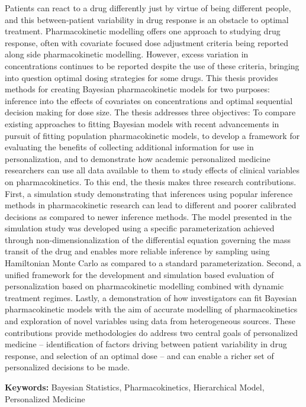 \documentclass[12pt,twoside]{report}
\numberwithin{figure}{chapter}
\newenvironment{preliminary}%
{\pagestyle{plain}\pagenumbering{roman}}%
{\pagenumbering{arabic}}
\begin{document}
\begin{preliminary}
	Patients can react to a drug differently just by virtue of being different people, and this between-patient variability in drug response is an obstacle to optimal treatment.  Pharmacokinetic modelling offers one approach to studying drug response, often with covariate focused dose adjustment criteria being reported along side pharmacokinetic modelling.  However, excess variation in concentrations continues to be reported despite the use of these criteria, bringing into question optimal dosing strategies for some drugs.  This thesis provides methods for creating Bayesian pharmacokinetic models for two purposes: inference into the effects of covariates on concentrations and optimal sequential decision making for dose size.   The thesis addresses three objectives: To compare existing approaches to fitting Bayesian models with recent advancements in pursuit of fitting population pharmacokinetic models, to develop a framework for evaluating the benefits of collecting additional information for use in personalization, and to demonstrate how academic personalized medicine researchers can use all data available to them to study effects of clinical variables on pharmacokinetics. To this end, the thesis makes three research contributions. First, a simulation study demonstrating that inferences using popular inference methods in pharmacokinetic research can lead to different and poorer calibrated decisions as compared to newer inference methods.  The model presented in the simulation study was developed using a specific parameterization achieved through non-dimensionalization of the differential equation governing the mass transit of the drug and enables more reliable inference by sampling using Hamiltonian Monte Carlo as compared to a standard parameterization. Second, a unified framework for the development and simulation based evaluation of personalization based on pharmacokinetic modelling combined with dynamic treatment regimes. Lastly, a demonstration of how investigators can fit Bayesian pharmacokinetic models with the aim of accurate modelling of pharmacokinetics and exploration of novel variables using data from heterogeneous sources.  These contributions provide methodologies do address two central goals of personalized medicine -- identification of factors driving between patient variability in drug response, and selection of an optimal dose --  and can enable a richer set of personalized decisions to be made.
	
	\vfill
	\textbf{Keywords:} Bayesian Statistics, Pharmacokinetics, Hierarchical Model, Personalized Medicine
	\newpage
	\tableofcontents\newpage
	\newpage
	\listoffigures
	\newpage
	\listoftables\newpage
\end{preliminary}
\end{document}
